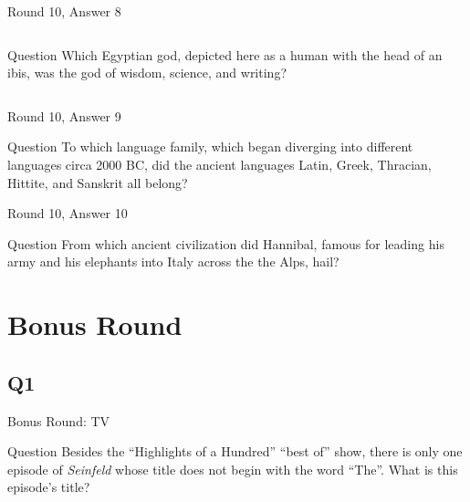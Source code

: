 \documentclass[11pt]{beamer}
\begin{document}
\begin{frame}[t]{Round 10, Answer 8}
\begin{columns}[T,totalwidth=\linewidth]
\begin{column}{0.32\linewidth}
\begin{block}{Question}
Which Egyptian god, depicted here as a human with the head of an ibis, was the god of wisdom, science, and writing?
\end{block}
\end{column}
\begin{column}{0.65\linewidth}
\begin{center}
\texttt{[image: \{Images/thoth]}.png}
\end{center}
\end{column}
\end{columns}
\end{frame}
\begin{frame}[t]{Round 10, Answer 9}
\begin{block}{Question}
To which language family, which began diverging into different languages circa  2000 BC, did the ancient languages Latin, Greek, Thracian, Hittite, and Sanskrit all belong?
\end{block}
\end{frame}
\begin{frame}[t]{Round 10, Answer 10}
\begin{block}{Question}
From which ancient civilization did Hannibal, famous for leading his army and his elephants into Italy across the the Alps, hail?
\end{block}
\end{frame}
\def\thisSectionName{Bonus}
\section{Bonus Round}
\subsection*{Q1}
\begin{frame}[t]{Bonus Round: TV}
\begin{block}{Question}
Besides the ``Highlights of a Hundred'' ``best of'' show, there is only one episode of \emph{Seinfeld} whose title does not begin with the word ``The''. What is this episode's title?
\end{block}
\end{frame}
\end{document}
